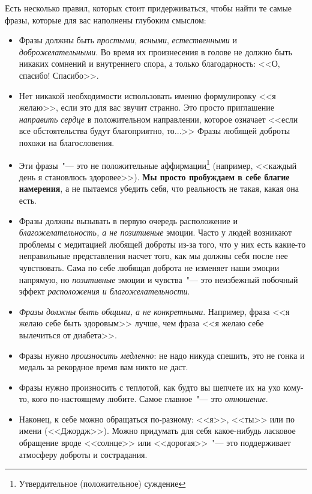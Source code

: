 Есть несколько правил, которых стоит придерживаться, чтобы найти те самые фразы, которые для вас наполнены глубоким смыслом:

\begin{itemize}
	\item Фразы должны быть \emph{простыми}, \emph{ясными}, \emph{естественными} и \emph{доброжелательными}. Во время их произнесения в голове не должно быть никаких сомнений и внутреннего спора, а только благодарность: <<О, спасибо! Спасибо>>.
	
	\item Нет никакой необходимости использовать именно формулировку <<я желаю>>, если это для вас звучит странно. Это просто приглашение \emph{направить сердце} в положительном направлении, которое означает <<если все обстоятельства будут благоприятно, то...>> Фразы любящей доброты похожи на благословения.
	
	\item Эти фразы~"--- это не положительные аффирмации\footnote{Утвердительное (положительное) суждение} (например, <<каждый день я становлюсь здоровее>>). \textbf{Мы просто пробуждаем в себе благие намерения}, а не пытаемся убедить себя, что реальность не такая, какая она есть.
	
	\item Фразы должны вызывать в первую очередь расположение и \emph{благожелательность, а не позитивные} эмоции. Часто у людей возникают проблемы с медитацией любящей доброты из-за того, что у них есть какие-то неправильные представления насчет того, как мы должны себя после нее чувствовать. Сама по себе любящая доброта не изменяет наши эмоции напрямую, но \emph{позитивные} эмоции и чувства~"--- это неизбежный побочный эффект \emph{расположения и благожелательности}.
	
	\item \emph{Фразы должны быть общими, а не конкретными}. Например, фраза <<я желаю себе быть здоровым>> лучше, чем фраза <<я желаю себе вылечиться от диабета>>.
	
	\item Фразы нужно \emph{произносить медленно}: не надо никуда спешить, это не гонка и медаль за рекордное время вам никто не даст.
	
	\item Фразы нужно произносить с теплотой, как будто вы шепчете их на ухо кому-то, кого по-настоящему любите. Самое главное~"--- это \emph{отношение}.
	
	\item Наконец, к себе можно обращаться по-разному: <<я>>, <<ты>> или по имени (<<Джордж>>). Можно придумать для себя какое-нибудь ласковое обращение вроде <<солнце>> или <<дорогая>>~"--- это поддерживает атмосферу доброты и сострадания.
\end{itemize}

